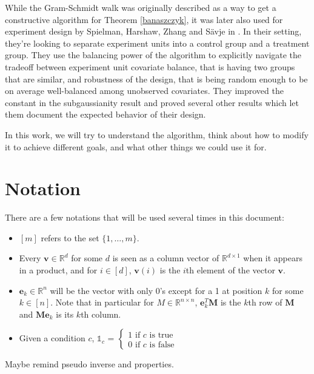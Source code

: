 \documentclass[12pt]{article}
\begin{document}
While the Gram-Schmidt walk was originally described as a way to get a constructive algorithm for Theorem \ref{banaszczyk}, it was later also used for experiment design by Spielman, Harshaw, Zhang and Sävje in \cite{harshaw2019balancing}. In their setting, they're looking to separate experiment units into a control group and a treatment group.  They use the balancing power of the algorithm to explicitly navigate the tradeoff between experiment unit covariate balance, that is having two groups that are similar, and robustness of the design, that is being random enough to be on average well-balanced among unobserved covariates. They improved the constant in the subgaussianity result and proved several other results which let them document the expected behavior of their design.

In this work, we will try to understand the algorithm, think about how to modify it to achieve different goals, and what other things we could use it for.

\section{Notation}
There are a few notations that will be used several times in this document:
\begin{itemize}
\item $[m]$ refers to the set $\{1,\dots,m\}$.
\item Every $\textbf{v}\in\mathbb{R}^d$ for some $d$ is seen as a column vector of $\mathbb{R}^{d\times 1}$ when it appears in a product, and for $i\in[d]$, $\textbf{v}(i)$ is the $i$th element of the vector $\textbf{v}$.
\item $\textbf{e}_k\in\mathbb{R}^{n}$ will be the vector with only 0's except for a 1 at position $k$ for some $k\in[n]$. Note that in particular for $M\in\mathbb{R}^{n\times n}$, $\textbf{e}_k^T\textbf{M}$ is the $k$th row of $\textbf{M}$ and $\textbf{Me}_k$ is its $k$th column.
\item Given a condition $c$, $\mathds{1}_{c}$ = $\begin{cases}
            1 \textrm{ if }c\textrm{ is true}\\
            0 \textrm{ if }c\textrm{ is false}
        \end{cases}$
\end{itemize}
Maybe remind pseudo inverse and properties.
\end{document}
